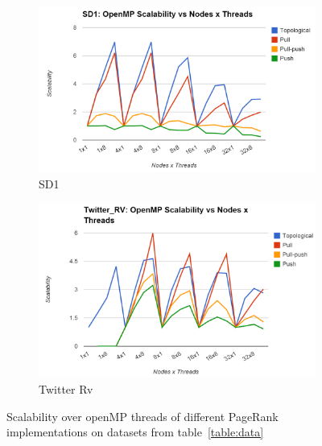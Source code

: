 \documentclass[letterpaper,11pt,onecolumn]{article}
\begin{document}
\begin{appendices}
\begin{figure}[!h]
\begin{subfigure}{.5\textwidth}
  \centering
  \includegraphics[width=.99\linewidth]{SD1OMPScalability}
  \caption{SD1}
  \label{fig:lgtime}
\end{subfigure}%
\begin{subfigure}{.5\textwidth}
  \centering
  \includegraphics[width=.99\linewidth]{TwitterRVOMPScalability}
  \caption{Twitter Rv}
  \label{fig:ftime}
\end{subfigure}
\caption{Scalability over openMP threads of different PageRank implementations on datasets from table~\ref{table:data}}
\label{fig:scOMP2}
\end{figure}


\end{appendices}
\end{document}
